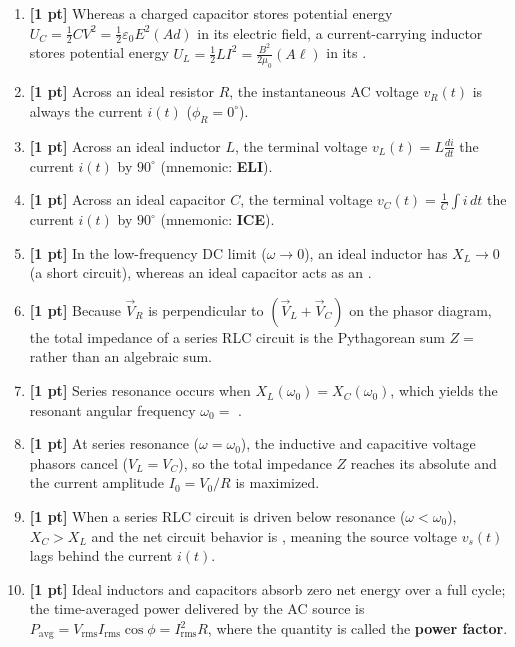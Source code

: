 \documentclass[10pt,letterpaper]{article}
\begin{document}
\begin{enumerate}
  \item \textbf{[1 pt]} Whereas a charged capacitor stores potential energy $U_C = \frac{1}{2}CV^2 = \frac{1}{2}\varepsilon_0 E^2 (Ad)$ in its electric field, a current-carrying inductor stores potential energy $U_L = \frac{1}{2}LI^2 = \frac{B^2}{2\mu_0}(A\ell)$ in its \underline{\hspace{1.8in}}.
  \item \textbf{[1 pt]} Across an ideal resistor $R$, the instantaneous AC voltage $v_R(t)$ is always \underline{\hspace{1.8in}} the current $i(t)$ ($\phi_R = 0^\circ$).
  \item \textbf{[1 pt]} Across an ideal inductor $L$, the terminal voltage $v_L(t) = L\frac{di}{dt}$ \underline{\hspace{1.8in}} the current $i(t)$ by $90^\circ$ (mnemonic: \textbf{ELI}).
  \item \textbf{[1 pt]} Across an ideal capacitor $C$, the terminal voltage $v_C(t) = \frac{1}{C}\int i\,dt$ \underline{\hspace{1.8in}} the current $i(t)$ by $90^\circ$ (mnemonic: \textbf{ICE}).
  \item \textbf{[1 pt]} In the low-frequency DC limit ($\omega \to 0$), an ideal inductor has $X_L \to 0$ (a short circuit), whereas an ideal capacitor acts as an \underline{\hspace{1.8in}}.
  \item \textbf{[1 pt]} Because $\vec{V}_R$ is perpendicular to $(\vec{V}_L + \vec{V}_C)$ on the phasor diagram, the total impedance of a series RLC circuit is the Pythagorean sum $Z =$ \underline{\hspace{1.8in}} rather than an algebraic sum.
  \item \textbf{[1 pt]} Series resonance occurs when $X_L(\omega_0) = X_C(\omega_0)$, which yields the resonant angular frequency $\omega_0 =$ \underline{\hspace{1.8in}}.
  \item \textbf{[1 pt]} At series resonance ($\omega = \omega_0$), the inductive and capacitive voltage phasors cancel ($V_L = V_C$), so the total impedance $Z$ reaches its absolute \underline{\hspace{1.8in}} and the current amplitude $I_0 = V_0/R$ is maximized.
  \item \textbf{[1 pt]} When a series RLC circuit is driven below resonance ($\omega < \omega_0$), $X_C > X_L$ and the net circuit behavior is \underline{\hspace{1.8in}}, meaning the source voltage $v_s(t)$ lags behind the current $i(t)$.
  \item \textbf{[1 pt]} Ideal inductors and capacitors absorb zero net energy over a full cycle; the time-averaged power delivered by the AC source is $P_{\text{avg}} = V_{\text{rms}} I_{\text{rms}} \cos\phi = I_{\text{rms}}^2 R$, where the quantity \underline{\hspace{1.8in}} is called the \textbf{power factor}.
\end{enumerate}
\end{document}
